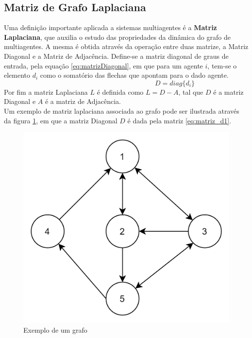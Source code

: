 \subsection{Matriz de Grafo Laplaciana}
Uma definição importante aplicada a sistemas multiagentes é a \textbf{Matriz Laplaciana}, que auxilia o estudo das propriedades da dinâmica do grafo de multiagentes. A mesma é obtida através da operação entre duas matrize, a Matriz Diagonal e a Matriz de Adjacência.
Define-se a matriz diagonal de graus de entrada, pela equação \ref{eq:matrizDiagonal}, em que para um agente $i$, tem-se o elemento $d_{i}$ como o somatório das flechas que apontam para o dado agente.
\begin{equation}\label{eq:matrizDiagonal}
\hspace{6cm} %
    D = diag\{d_{i}\}
\end{equation}
Por fim a matriz Laplaciana $L$ é definida como $L = D-A$, tal que $D$ é a matriz Diagonal e $A$ é a matriz de Adjacência.
\\
Um exemplo de matriz laplaciana associada ao grafo pode ser ilustrada através da figura \ref{fig:exemplo_grafo}, em que a matriz Diagonal $D$ é dada pela matriz \ref{eq:matriz_d1}. 

\begin{figure}
    \centering
    \includegraphics[scale=0.2]{figures/Multiagente/ex_grafos1.png}
    \caption{Exemplo de um grafo}
    \label{fig:exemplo_grafo}
\end{figure}

